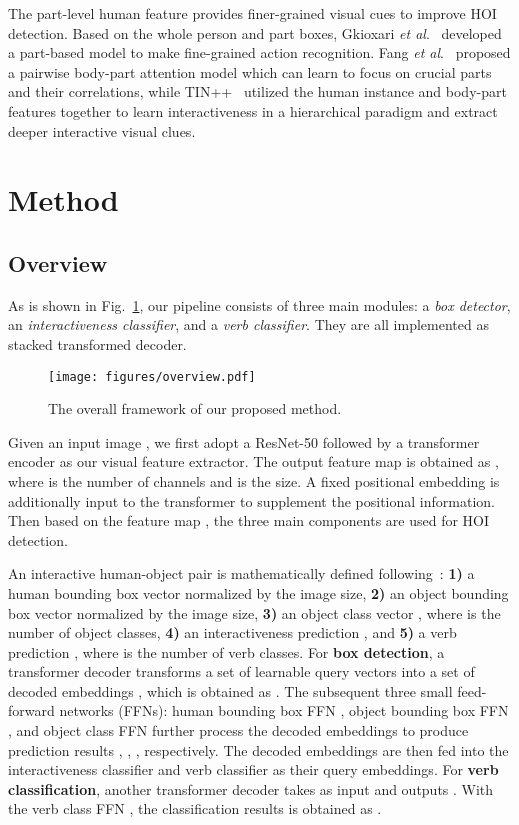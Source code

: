 \documentclass[runningheads]{llncs}
\newcommand{\etal}{\textit{et al}.}
\begin{document}
The part-level human feature provides finer-grained visual cues to improve HOI detection.  
Based on the whole person and part boxes, Gkioxari \etal~\cite{gkioxari2015actions} developed a part-based model to make fine-grained action recognition. Fang \etal~\cite{Fang2018Pairwise} proposed a pairwise body-part attention model which can learn to focus on crucial parts and their correlations, while TIN++~\cite{li2021transferable} utilized the human instance and body-part features together to learn interactiveness in a hierarchical paradigm and extract deeper interactive visual clues.

\section{Method}
\subsection{Overview}
As is shown in Fig.~\ref{fig:overview}, our pipeline consists of three main modules: a \textit{box detector}, an \textit{interactiveness classifier}, and a \textit{verb classifier}. They are all implemented as stacked transformed decoder.

\begin{figure}
\centering
\texttt{[image: figures/overview.pdf]}
\caption{The overall framework of our proposed method. 
} 
\label{fig:overview} 
\end{figure}

Given an input image , we first adopt a ResNet-50 followed by a transformer encoder as our visual feature extractor. The output feature map is obtained as , where  is the number of channels and  is the size. A fixed positional embedding  is additionally input to the transformer to supplement the positional information. 
Then based on the feature map , the three main components are used for HOI detection. 

An interactive human-object pair is mathematically defined following~\cite{qpic}: 
\textbf{1)} a human bounding box vector  normalized by the image size, 
\textbf{2)} an object bounding box vector  normalized by the image size, 
\textbf{3)} an object class vector , where  is the number of object classes, 
\textbf{4)} an interactiveness prediction , and
\textbf{5)} a verb prediction , where  is the number of verb classes. 
For \textbf{box detection}, a transformer decoder  transforms a set of learnable query vectors  into a set of decoded embeddings , which is obtained as .
The subsequent three small feed-forward networks (FFNs): human bounding box FFN , object bounding box FFN , and object class FFN  further process the decoded embeddings  to produce  prediction results , , , respectively. The decoded embeddings  are then fed into the interactiveness classifier and verb classifier as their query embeddings.
For \textbf{verb classification}, another transformer decoder  
takes  as input and outputs . With the verb class FFN , the classification results is obtained as .
\end{document}
